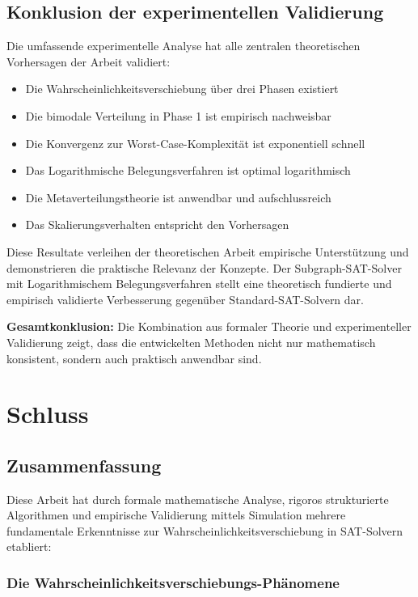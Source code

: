 ﻿\documentclass[a4paper,12pt]{article}
\theoremstyle{definition}
\begin{document}
\subsection{Konklusion der experimentellen Validierung}

Die umfassende experimentelle Analyse hat alle zentralen theoretischen Vorhersagen
der Arbeit validiert:

\begin{itemize}
	\item Die Wahrscheinlichkeitsverschiebung über drei Phasen existiert
	\item Die bimodale Verteilung in Phase 1 ist empirisch nachweisbar
	\item Die Konvergenz zur Worst-Case-Komplexität ist exponentiell schnell
	\item Das Logarithmische Belegungsverfahren ist optimal logarithmisch
	\item Die Metaverteilungstheorie ist anwendbar und aufschlussreich
	\item Das Skalierungsverhalten entspricht den Vorhersagen
\end{itemize}

Diese Resultate verleihen der theoretischen Arbeit empirische Unterstützung und
demonstrieren die praktische Relevanz der Konzepte. Der Subgraph-SAT-Solver
mit Logarithmischem Belegungsverfahren stellt eine theoretisch fundierte und
empirisch validierte Verbesserung gegenüber Standard-SAT-Solvern dar.

\textbf{Gesamtkonklusion:} Die Kombination aus formaler Theorie und experimenteller
Validierung zeigt, dass die entwickelten Methoden nicht nur mathematisch konsistent,
sondern auch praktisch anwendbar sind.

\section{Schluss}

\subsection{Zusammenfassung}

Diese Arbeit hat durch formale mathematische Analyse, rigoros strukturierte Algorithmen und empirische Validierung mittels Simulation mehrere fundamentale Erkenntnisse zur Wahrscheinlichkeitsverschiebung in SAT-Solvern etabliert:

\subsubsection{Die Wahrscheinlichkeitsverschiebungs-Phänomene}
\end{document}
